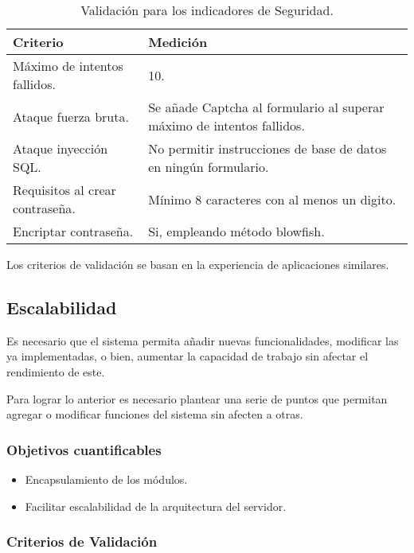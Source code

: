 \begin{table}[H]
    \caption[Validación para los indicadores de Seguridad.] {Validación para los indicadores de Seguridad.}
    \label{tbl:Criterios de Validación Seguridad}
    \begin{tabular}{|p{}|p{}|}
        \hline
        \textbf{Criterio} &  \textbf{Medición}\\
    	\hline
    	\hline
    	Máximo de intentos fallidos.	& 10.  \\ \hline
    	Ataque fuerza bruta. & Se añade Captcha al formulario al superar máximo de intentos fallidos.  \\ \hline
		Ataque inyección SQL. & No permitir instrucciones de base de datos en ningún formulario.  \\ \hline
		Requisitos al crear contraseña. & Mínimo 8 caracteres con al menos un digito.  \\ \hline
		Encriptar contraseña. & Si, empleando método blowfish.  \\ \hline
    \end{tabular}
\end{table}
Los criterios de validación se basan en la experiencia de aplicaciones similares.

\subsection{Escalabilidad}

Es necesario que el sistema permita añadir nuevas funcionalidades, modificar las ya implementadas, o bien, aumentar la capacidad de trabajo sin afectar el rendimiento de este. 

Para lograr lo anterior es necesario plantear una serie de puntos que permitan agregar o modificar funciones del sistema sin afecten a otras. 

\subsubsection{Objetivos cuantificables}

\begin{itemize}
	\item
	Encapsulamiento de los módulos.
	\item
	Facilitar escalabilidad de la arquitectura del servidor.
\end{itemize}

\subsubsection{Criterios de Validación}

